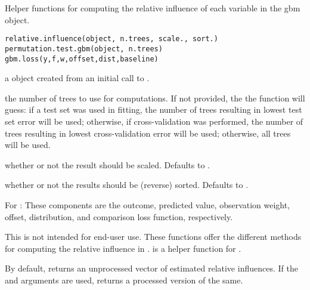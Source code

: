 \begin{Description}\relax
Helper functions for computing the relative influence of each variable in the gbm object.
\end{Description}
\begin{Usage}
\begin{verbatim}
relative.influence(object, n.trees, scale., sort.)
permutation.test.gbm(object, n.trees)
gbm.loss(y,f,w,offset,dist,baseline)
\end{verbatim}
\end{Usage}
\begin{Arguments}
\begin{ldescription}
\item[\code{object}] a  object created from an initial call to .
\item[\code{n.trees}] the number of trees to use for computations. If not provided, the
the function will guess: if a test set was used in fitting, the number of
trees resulting in lowest test set error will be used; otherwise, if
cross-validation was performed, the number of trees resulting in lowest
cross-validation error will be used; otherwise, all trees will be used.
\item[\code{scale.}] whether or not the result should be scaled. Defaults to .
\item[\code{sort.}] whether or not the results should be (reverse) sorted.
Defaults to .
\item[\code{y,f,w,offset,dist,baseline}] For : These components are the
outcome, predicted value, observation weight, offset, distribution, and comparison
loss function, respectively.
\end{ldescription}
\end{Arguments}
\begin{Details}\relax
This is not intended for end-user use. These functions offer the different
methods for computing the relative influence in .
 is a helper function for .
\end{Details}
\begin{Value}
By default, returns an unprocessed vector of estimated relative influences.
If the  and  arguments are used, returns a processed
version of the same.
\end{Value}
